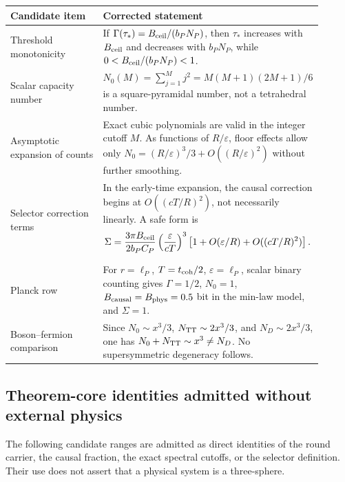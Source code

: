 \documentclass[11pt,a4paper]{article}
\begin{document}
\begin{center}
\small
\begin{tabular}{p{0.32\linewidth}p{0.58\linewidth}}
\toprule
Candidate item & Corrected statement\\
\midrule
Threshold monotonicity & If \(\Gamma(\tau_*)=B_{\rm ceil}/(b_PN_P)\), then \(\tau_*\) increases with \(B_{\rm ceil}\) and decreases with \(b_PN_P\), while \(0<B_{\rm ceil}/(b_PN_P)<1\).\\
Scalar capacity number & \(N_0(M)=\sum_{j=1}^M j^2=M(M+1)(2M+1)/6\) is a square-pyramidal number, not a tetrahedral number.\\
Asymptotic expansion of counts & Exact cubic polynomials are valid in the integer cutoff \(M\).  As functions of \(R/\varepsilon\), floor effects allow only \(N_0=(R/\varepsilon)^3/3+O((R/\varepsilon)^2)\) without further smoothing.\\
Selector correction terms & In the early-time expansion, the causal correction begins at \(O((cT/R)^2)\), not necessarily linearly.  A safe form is
\[
\Sigma=
\frac{3\pi B_{\rm ceil}}{2b_PC_P}
\left(\frac{\varepsilon}{cT}\right)^3
\left[1+O(\varepsilon/R)+O((cT/R)^2)\right].
\]\\
Planck row & For \(r=\ell_P\), \(T=t_{\rm coh}/2\), \(\varepsilon=\ell_P\), scalar binary counting gives \(\Gamma=1/2\), \(N_0=1\), \(B_{\rm causal}=B_{\rm phys}=0.5\) bit in the min-law model, and \(\Sigma=1\).\\
Boson--fermion comparison & Since \(N_0\sim x^3/3\), \(N_{\rm TT}\sim2x^3/3\), and \(N_D\sim2x^3/3\), one has \(N_0+N_{\rm TT}\sim x^3\ne N_D\).  No supersymmetric degeneracy follows.\\
\bottomrule
\end{tabular}
\end{center}

\subsection{Theorem-core identities admitted without external physics}

The following candidate ranges are admitted as direct identities of the round carrier, the causal fraction, the exact spectral cutoffs, or the selector definition.  Their use does not assert that a physical system is a three-sphere.
\end{document}
